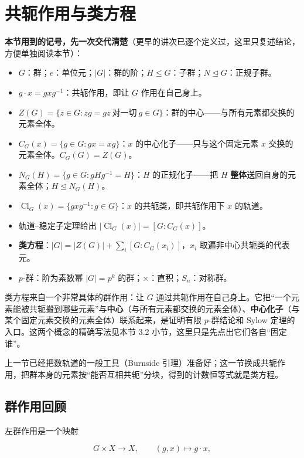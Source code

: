 \section{共轭作用与类方程}


\textbf{本节用到的记号，先一次交代清楚}（更早的讲次已逐个定义过，这里只复述结论，方便单独阅读本节）：

\begin{itemize}
\item $G$：群；$e$：单位元；$|G|$：群的阶；$H\le G$：子群；$N\trianglelefteq G$：正规子群。
\item $g\cdot x=gxg^{-1}$：共轭作用，即让 $G$ 作用在自己身上。
\item $Z(G)=\{z\in G:zg=gz\ \text{对一切}\ g\in G\}$：群的中心——与所有元素都交换的元素全体。
\item $C_G(x)=\{g\in G:gx=xg\}$：$x$ 的中心化子——只与这个固定元素 $x$ 交换的元素全体。$C_G(G)=Z(G)$。
\item $N_G(H)=\{g\in G:gHg^{-1}=H\}$：$H$ 的正规化子——把 $H$ \textbf{整体}送回自身的元素全体；$H\trianglelefteq N_G(H)$。
\item $\operatorname{Cl}_G(x)=\{gxg^{-1}:g\in G\}$：$x$ 的共轭类，即共轭作用下 $x$ 的轨道。
\item 轨道--稳定子定理给出 $|\operatorname{Cl}_G(x)|=[G:C_G(x)]$。
\item \textbf{类方程}：$|G|=|Z(G)|+\sum_{i}[G:C_G(x_i)]$，$x_i$ 取遍非中心共轭类的代表元。
\item $p$-群：阶为素数幂 $|G|=p^k$ 的群；$\times$：直积；$S_n$：对称群。
\end{itemize}


类方程来自一个非常具体的群作用：让 $G$ 通过共轭作用在自己身上。它把“一个元素能被共轭搬到哪些元素”与\textbf{中心}（与所有元素都交换的元素全体）、\textbf{中心化子}（与某个固定元素交换的元素全体）联系起来，是证明有限 $p$-群结论和 Sylow 定理的入口。这两个概念的精确写法见本节 3.2 小节，这里只是先点出它们各自“固定谁”。

上一节已经把数轨道的一般工具（Burnside 引理）准备好；这一节换成共轭作用，把群本身的元素按“能否互相共轭”分块，得到的计数恒等式就是类方程。

\subsection{群作用回顾}


左群作用是一个映射

\[
G\times X\longrightarrow X,\qquad (g,x)\longmapsto g\cdot x,
\]

